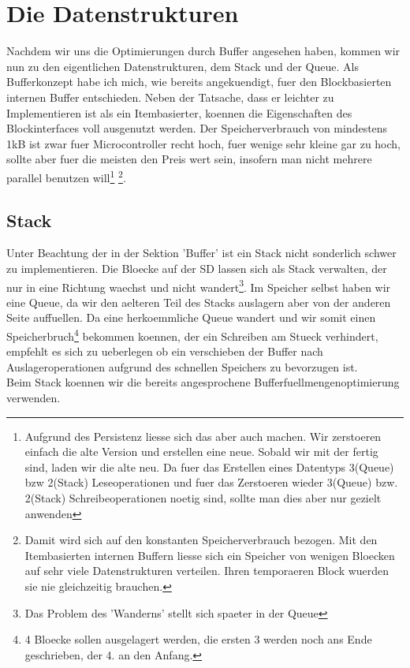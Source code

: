 \documentclass[10pt,a4paper]{article}
\begin{document}
\section{Die Datenstrukturen}
Nachdem wir uns die Optimierungen durch Buffer angesehen haben, kommen wir nun zu den eigentlichen Datenstrukturen, dem Stack und der Queue. Als Bufferkonzept habe ich mich, wie bereits angekuendigt, fuer den Blockbasierten internen Buffer entschieden. Neben der Tatsache, dass er leichter zu Implementieren ist als ein Itembasierter, koennen die Eigenschaften des Blockinterfaces voll ausgenutzt werden. Der Speicherverbrauch von mindestens 1kB ist zwar fuer Microcontroller recht hoch, fuer wenige sehr kleine gar zu hoch, sollte aber fuer die meisten den Preis wert sein, insofern man nicht mehrere parallel benutzen will\footnote{Aufgrund des Persistenz liesse sich das aber auch machen. Wir zerstoeren einfach die alte Version und erstellen eine neue. Sobald wir mit der fertig sind, laden wir die alte neu. Da fuer das Erstellen eines Datentyps 3(Queue) bzw 2(Stack) Leseoperationen und fuer das Zerstoeren wieder 3(Queue) bzw. 2(Stack) Schreibeoperationen noetig sind, sollte man dies aber nur gezielt anwenden} \footnote{Damit wird sich auf den konstanten Speicherverbrauch bezogen. Mit den Itembasierten internen Buffern liesse sich ein Speicher von wenigen Bloecken auf sehr viele Datenstrukturen verteilen. Ihren temporaeren Block wuerden sie nie gleichzeitig brauchen.}.
\subsection{Stack}
Unter Beachtung der in der Sektion 'Buffer' ist ein Stack nicht sonderlich schwer zu implementieren. Die Bloecke auf der SD lassen sich als Stack verwalten, der nur in eine Richtung waechst und nicht wandert\footnote{Das Problem des 'Wanderns' stellt sich spaeter in der Queue}. Im Speicher selbst haben wir eine Queue, da wir den aelteren Teil des Stacks auslagern aber von der anderen Seite auffuellen. Da eine herkoemmliche Queue wandert und wir somit einen Speicherbruch\footnote{4 Bloecke sollen ausgelagert werden, die ersten 3 werden noch ans Ende geschrieben, der 4. an den Anfang.} bekommen koennen, der ein Schreiben am Stueck verhindert, empfehlt es sich zu ueberlegen ob ein verschieben der Buffer nach Auslageroperationen aufgrund des schnellen Speichers zu bevorzugen ist.\\
Beim Stack koennen wir die bereits angesprochene Bufferfuellmengenoptimierung verwenden. 
\end{document}
